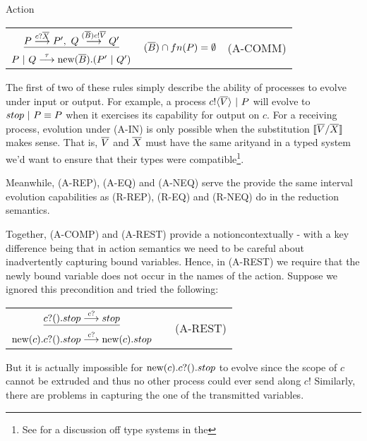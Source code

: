 \begin{definition}{Action}
\begin{center}
\begin{tabular}{rllll}
		\multicolumn{3}{c}{$\underline{P\evolves{\receives{c}{\tuple{X}}} P',\ Q \evolves{\exports{\tuple{B}}\sends{c}{\tuple{V}}} Q'}$} & \multirow{2}{*}{\footnotesize{$\textstyle ({\overline{B}})\cap fn(P) = \emptyset$ }} & \multirow{2}{*}{\tiny{(A-COMM)}}\\
		\multicolumn{3}{c}{$P\ |\  Q \overset{{\tau}}{\longrightarrow} \text{new}({\overline{B}}).(P'\ |\  Q')$}\\[10pt]
	\end{tabular}\end{center}
\end{definition}
 The first of two of these rules simply describe the ability of processes to evolve under input or output.  For example, a process ${c}!\langle{ \ensuremath{\overline{V}} }\rangle \ |\  P$ will evolve to $stop \ |\  P \equiv P$ when it exercises its capability for output on $c$.  For a receiving process, evolution under (A-IN) is only possible when the substitution $\llbracket{ \ensuremath{\overline{V}} }/{\overline{X}}\rrbracket$ makes sense.  That is, $\overline{V}$ and $\overline{X}$ must have the same arityand in a typed system we'd want to ensure that their types were compatible\footnote{See \cite{henn07} for a discussion off type systems in the \picalc}.

Meanwhile, (A-REP), (A-EQ) and (A-NEQ) serve the provide the same interval evolution capabilities as (R-REP), (R-EQ) and (R-NEQ) do in the reduction semantics.

Together, (A-COMP) and (A-REST) provide a notioncontextually - with a key difference being that in action semantics we need to be careful about inadvertently capturing bound variables.  Hence, in (A-REST) we require that the newly bound variable does not occur in the names of the action.  Suppose we ignored this precondition and tried the following:
\begin{center}\begin{tabular}{rllll}
	\multicolumn{3}{c}{$\underline{{c}?({}).stop \overset{{{c}?{}}}{\longrightarrow} stop}$} & & \multirow{2}{*}{\tiny{(A-REST)}}\\
	\multicolumn{3}{c}{$\text{new}({c}). {c}?({}).stop \overset{{{c}?{}}}{\longrightarrow} \text{new}({c}). stop$}\\[10pt]
\end{tabular}\end{center}
But it is actually impossible for $\text{new}({c}). {c}?({}).stop$ to evolve since the scope of $c$ cannot be extruded and thus no other process could ever send along $c$!  Similarly, there are problems in capturing the one of the transmitted variables.  

